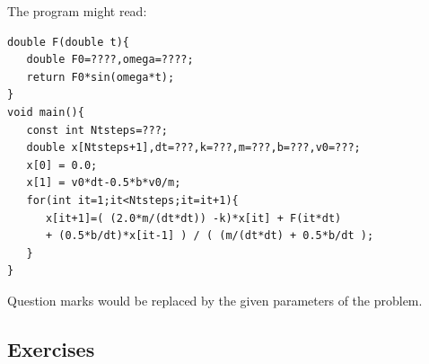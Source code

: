 The program might read:
{\tt\begin{verbatim}
double F(double t){
   double F0=????,omega=????;
   return F0*sin(omega*t);
}
void main(){
   const int Ntsteps=???;
   double x[Ntsteps+1],dt=???,k=???,m=???,b=???,v0=???;
   x[0] = 0.0;
   x[1] = v0*dt-0.5*b*v0/m;
   for(int it=1;it<Ntsteps;it=it+1){
      x[it+1]=( (2.0*m/(dt*dt)) -k)*x[it] + F(it*dt)
      + (0.5*b/dt)*x[it-1] ) / ( (m/(dt*dt) + 0.5*b/dt );
   }
}
\end{verbatim}}
Question marks would be replaced by the given parameters of the problem.

\exampleend

\subsection{Exercises}

